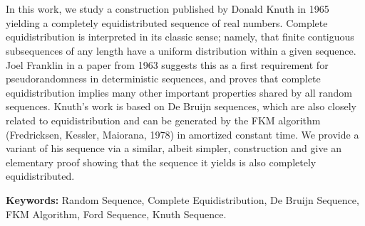 \chapter*{\runtitle}

\noindent In this work, we study a construction published by Donald Knuth in 1965 yielding a completely equidistributed sequence of real numbers. Complete equidistribution is interpreted in its classic sense; namely, that finite contiguous subsequences of any length have a uniform distribution within a given sequence. Joel Franklin in a paper from 1963 suggests this as a first requirement for pseudorandomness in deterministic sequences, and proves that complete equidistribution implies many other important properties shared by all random sequences. Knuth's work is based on De Bruijn sequences, which are also closely related to equidistribution and can be generated by the FKM algorithm (Fredricksen, Kessler, Maiorana, 1978) in amortized constant time. We provide a variant of his sequence via a similar, albeit simpler, construction and give an elementary proof showing that the sequence it yields is also completely equidistributed.

\bigskip

\noindent\textbf{Keywords:} Random Sequence, Complete Equidistribution, De Bruijn Sequence, FKM Algorithm, Ford Sequence, Knuth Sequence.
